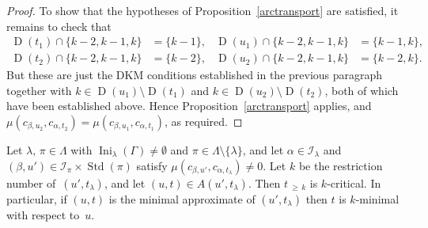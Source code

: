 \documentclass[ALCO,ThmDefs,Unicode,epreuves]{cedram}
\DeclareMathOperator{\Ini}{Ini}
\newcommand{\Morethan}[2]{#1\,{_{\geqslant\,#2}}}
\DeclareMathOperator{\STD}{Std}
\DeclareMathOperator{\D}{D}
\begin{document}
\begin{proof}
To show that the hypotheses of Proposition~\ref{arctransport} are satisfied, it
remains to check that
\begin{align*}
\D(t_1)\cap \{k-2,k-1,k\} &= \{k-1\},&\D(u_1)\cap \{k-2,k-1,k\} &= \{k-1,k\},\\
\D(t_2)\cap \{k-2,k-1,k\} &= \{k-2\},&\D(u_2)\cap \{k-2,k-1,k\} &= \{k-2,k\}.
\end{align*}
But these are just the DKM conditions established in the previous paragraph together
with $k\in \D(u_1)\setminus\D(t_1)$ and $k\in \D(u_2)\setminus\D(t_2)$, both
of which have been established above. Hence Proposition~\ref{arctransport} applies,
and $\mu(c_{\beta,u_2},c_{\alpha,t_2})=\mu(c_{\beta,u_1},c_{\alpha,t_1})$, as required.
\end{proof}

\begin{prop}\label{cellorder}
Let $\lambda,\,\pi\in\Lambda$ with $\Ini_\lambda(\Gamma)\ne\emptyset$ and
$\pi\in\Lambda\setminus\{\lambda\}$, and let $\alpha\in\mathcal I_\lambda$
and $(\beta,u')\in\mathcal I_\pi\times\STD(\pi)$ satisfy
$\mu(c_{\beta,u'},c_{\alpha,t_\lambda})\neq 0$.
Let $k$ be the restriction number of~$(u',t_\lambda)$, and let $(u,t)\in A(u',t_\lambda)$.
Then $\Morethan tk$ is $k$-critical. In particular, if $(u,t)$ is
the minimal approximate of $(u',t_\lambda)$ then $t$ is $k$-minimal
with respect to~$u$.
\end{prop}
\end{document}
